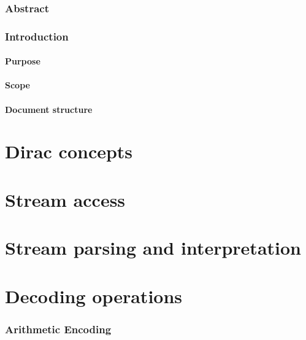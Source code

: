 

\section{Abstract}
\section{Introduction}
\subsection{Purpose}
\subsection{Scope}
\subsection{Document structure}


\part{Dirac concepts}
\part{Stream access}
\part{Stream parsing and interpretation}
\part{Decoding operations}



\appendix
\section{Arithmetic Encoding}
